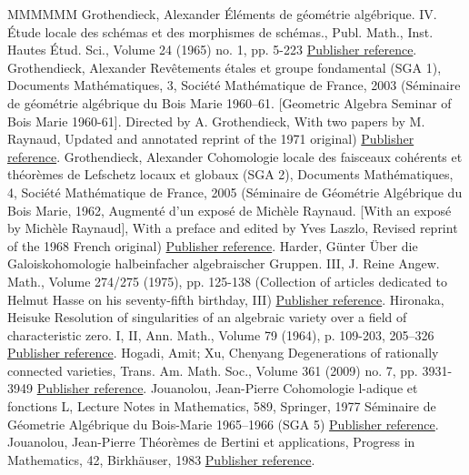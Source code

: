 \begin{thebibliography}{MMMMMM}
 Grothendieck, Alexander Éléments de géométrie algébrique. IV. Étude locale des schémas et des morphismes de schémas., Publ. Math., Inst. Hautes Étud. Sci., Volume 24 (1965) no. 1, pp. 5-223 \href{https://ahl.centre-mersenne.org/item/AHL_2020__3__1399_0/#EGA4}{Publisher reference}.
 Grothendieck, Alexander Revêtements étales et groupe fondamental (SGA 1), Documents Mathématiques, 3, Société Mathématique de France, 2003 (Séminaire de géométrie algébrique du Bois Marie 1960–61. [Geometric Algebra Seminar of Bois Marie 1960-61]. Directed by A. Grothendieck, With two papers by M. Raynaud, Updated and annotated reprint of the 1971 original) \href{https://ahl.centre-mersenne.org/item/AHL_2020__3__1399_0/#SGA1}{Publisher reference}.
 Grothendieck, Alexander Cohomologie locale des faisceaux cohérents et théorèmes de Lefschetz locaux et globaux (SGA 2), Documents Mathématiques, 4, Société Mathématique de France, 2005 (Séminaire de Géométrie Algébrique du Bois Marie, 1962, Augmenté d’un exposé de Michèle Raynaud. [With an exposé by Michèle Raynaud], With a preface and edited by Yves Laszlo, Revised reprint of the 1968 French original) \href{https://ahl.centre-mersenne.org/item/AHL_2020__3__1399_0/#SGA2N}{Publisher reference}.
 Harder, Günter Über die Galoiskohomologie halbeinfacher algebraischer Gruppen. III, J. Reine Angew. Math., Volume 274/275 (1975), pp. 125-138 (Collection of articles dedicated to Helmut Hasse on his seventy-fifth birthday, III) \href{https://ahl.centre-mersenne.org/item/AHL_2020__3__1399_0/#Harder}{Publisher reference}.
 Hironaka, Heisuke Resolution of singularities of an algebraic variety over a field of characteristic zero. I, II, Ann. Math., Volume 79 (1964), p. 109-203, 205–326 \href{https://ahl.centre-mersenne.org/item/AHL_2020__3__1399_0/#Hir}{Publisher reference}.
 Hogadi, Amit; Xu, Chenyang Degenerations of rationally connected varieties, Trans. Am. Math. Soc., Volume 361 (2009) no. 7, pp. 3931-3949 \href{https://ahl.centre-mersenne.org/item/AHL_2020__3__1399_0/#HogadiXu}{Publisher reference}.
 Jouanolou, Jean-Pierre Cohomologie l-adique et fonctions L, Lecture Notes in Mathematics, 589, Springer, 1977 Séminaire de Géometrie Algébrique du Bois-Marie 1965–1966 (SGA 5) \href{https://ahl.centre-mersenne.org/item/AHL_2020__3__1399_0/#SGA5}{Publisher reference}.
 Jouanolou, Jean-Pierre Théorèmes de Bertini et applications, Progress in Mathematics, 42, Birkhäuser, 1983 \href{https://ahl.centre-mersenne.org/item/AHL_2020__3__1399_0/#Jou}{Publisher reference}.

\end{thebibliography}
